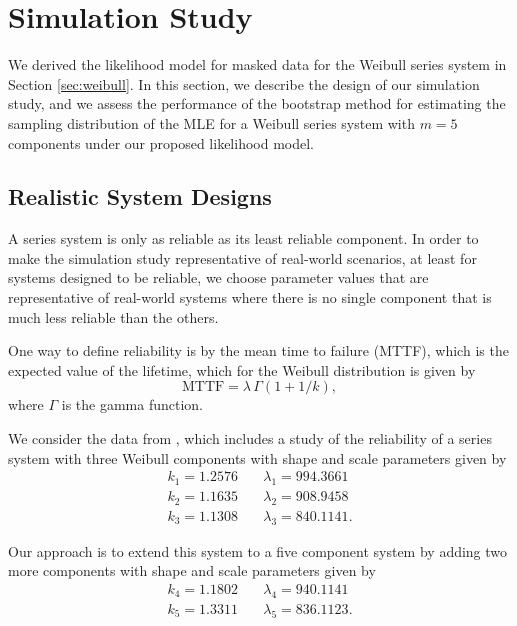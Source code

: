 \documentclass[
]{article}
\begin{document}
\hypertarget{simstudy}{%
\section{Simulation Study}\label{simstudy}}

We derived the likelihood model for masked data for the Weibull series
system in Section \ref{sec:weibull}. In this section, we describe the
design of our simulation study, and we assess the performance of the
bootstrap method for estimating the sampling distribution of the MLE for
a Weibull series system with \(m=5\) components under our proposed
likelihood model.

\hypertarget{realistic-system-designs}{%
\subsection{Realistic System Designs}\label{realistic-system-designs}}

A series system is only as reliable as its least reliable component. In
order to make the simulation study representative of real-world
scenarios, at least for systems designed to be reliable, we choose
parameter values that are representative of real-world systems where
there is no single component that is much less reliable than the others.

One way to define reliability is by the mean time to failure (MTTF),
which is the expected value of the lifetime, which for the Weibull
distribution is given by \[
\text{MTTF} = \lambda \, \Gamma(1 + 1/k),
\] where \(\Gamma\) is the gamma function.

We consider the data from \citep{Huairu-2013}, which includes a study of
the reliability of a series system with three Weibull components with
shape and scale parameters given by \begin{equation}
\begin{aligned}
    k_1 = 1.2576 &\quad \lambda_1 = 994.3661\\
    k_2 = 1.1635 &\quad \lambda_2 = 908.9458\\
    k_3 = 1.1308 &\quad \lambda_3 = 840.1141.
\end{aligned}
\end{equation}

Our approach is to extend this system to a five component system by
adding two more components with shape and scale parameters given by
\begin{equation}
\begin{aligned}
    k_4 = 1.1802 &\quad \lambda_4 = 940.1141\\
    k_5 = 1.3311 &\quad \lambda_5 = 836.1123.
\end{aligned}
\end{equation}
\end{document}

